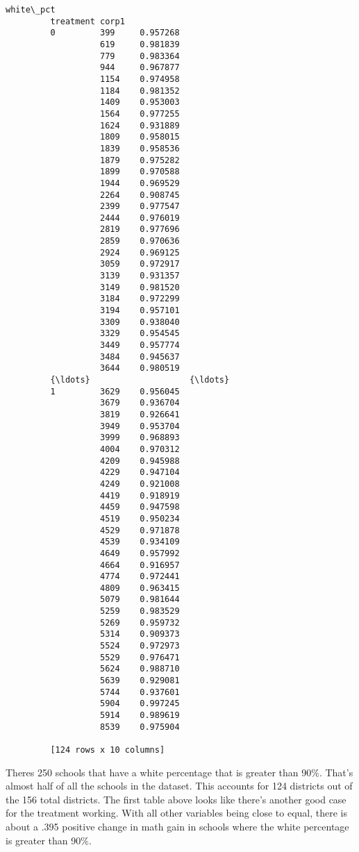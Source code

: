 \documentclass[11pt]{article}
\begin{document}
\begin{Verbatim}[commandchars=\\\{\}]
                          white\_pct  
         treatment corp1             
         0         399     0.957268  
                   619     0.981839  
                   779     0.983364  
                   944     0.967877  
                   1154    0.974958  
                   1184    0.981352  
                   1409    0.953003  
                   1564    0.977255  
                   1624    0.931889  
                   1809    0.958015  
                   1839    0.958536  
                   1879    0.975282  
                   1899    0.970588  
                   1944    0.969529  
                   2264    0.908745  
                   2399    0.977547  
                   2444    0.976019  
                   2819    0.977696  
                   2859    0.970636  
                   2924    0.969125  
                   3059    0.972917  
                   3139    0.931357  
                   3149    0.981520  
                   3184    0.972299  
                   3194    0.957101  
                   3309    0.938040  
                   3329    0.954545  
                   3449    0.957774  
                   3484    0.945637  
                   3644    0.980519  
         {\ldots}                    {\ldots}  
         1         3629    0.956045  
                   3679    0.936704  
                   3819    0.926641  
                   3949    0.953704  
                   3999    0.968893  
                   4004    0.970312  
                   4209    0.945988  
                   4229    0.947104  
                   4249    0.921008  
                   4419    0.918919  
                   4459    0.947598  
                   4519    0.950234  
                   4529    0.971878  
                   4539    0.934109  
                   4649    0.957992  
                   4664    0.916957  
                   4774    0.972441  
                   4809    0.963415  
                   5079    0.981644  
                   5259    0.983529  
                   5269    0.959732  
                   5314    0.909373  
                   5524    0.972973  
                   5529    0.976471  
                   5624    0.988710  
                   5639    0.929081  
                   5744    0.937601  
                   5904    0.997245  
                   5914    0.989619  
                   8539    0.975904  
         
         [124 rows x 10 columns]
\end{Verbatim}
            
    Theres 250 schools that have a white percentage that is greater than
90\%. That's almost half of all the schools in the dataset. This
accounts for 124 districts out of the 156 total districts. The first
table above looks like there's another good case for the treatment
working. With all other variables being close to equal, there is about a
.395 positive change in math gain in schools where the white percentage
is greater than 90\%.
\end{document}
